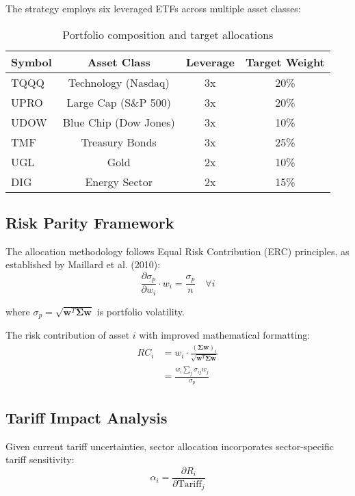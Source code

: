 \documentclass[onecolumn,11pt]{IEEEtran}
\begin{document}
The strategy employs six leveraged ETFs across multiple asset classes:

\begin{table}[h]
\centering
\begin{tabular}{lccc}
\toprule
Symbol & Asset Class & Leverage & Target Weight \\
\midrule
TQQQ & Technology (Nasdaq) & 3x & 20\% \\
UPRO & Large Cap (S\&P 500) & 3x & 20\% \\
UDOW & Blue Chip (Dow Jones) & 3x & 10\% \\
TMF & Treasury Bonds & 3x & 25\% \\
UGL & Gold & 2x & 10\% \\
DIG & Energy Sector & 2x & 15\% \\
\bottomrule
\end{tabular}
\caption{Portfolio composition and target allocations}
\end{table}

\subsection{Risk Parity Framework}

The allocation methodology follows Equal Risk Contribution (ERC) principles, as established by Maillard et al. (2010):
\begin{equation}
\frac{\partial \sigma_p}{\partial w_i} \cdot w_i = \frac{\sigma_p}{n} \quad \forall i
\end{equation}

where $\sigma_p = \sqrt{\mathbf{w}^T \boldsymbol{\Sigma} \mathbf{w}}$ is portfolio volatility.

The risk contribution of asset $i$ with improved mathematical formatting:
\begin{equation}
\begin{aligned}
RC_i &= w_i \cdot \frac{(\boldsymbol{\Sigma} \mathbf{w})_i}{\sqrt{\mathbf{w}^T \boldsymbol{\Sigma} \mathbf{w}}} \\
&= \frac{w_i \sum_j \sigma_{ij}w_j}{\sigma_p}
\end{aligned}
\end{equation}

\subsection{Tariff Impact Analysis}

Given current tariff uncertainties, sector allocation incorporates sector-specific tariff sensitivity:
\begin{equation}
\alpha_i = \frac{\partial R_i}{\partial \text{Tariff}_j}
\end{equation}
\end{document}
